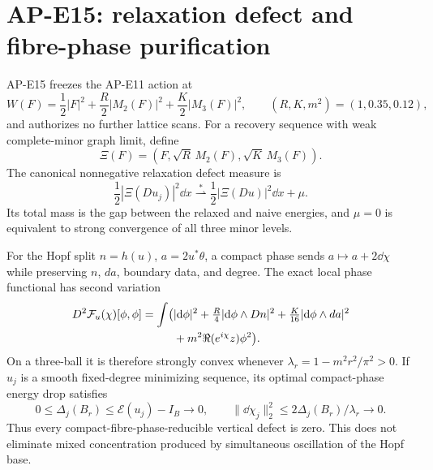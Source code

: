 \section{AP-E15: relaxation defect and fibre-phase purification}

AP-E15 freezes the AP-E11 action at
\begin{equation}
 W(F)=\frac12|F|^2+\frac R2|M_2(F)|^2+\frac K2|M_3(F)|^2,
 \qquad (R,K,m^2)=(1,0.35,0.12),
\end{equation}
and authorizes no further lattice scans.  For a recovery sequence with weak
complete-minor graph limit, define
\begin{equation}
 \Xi(F)=(F,\sqrt R\,M_2(F),\sqrt K\,M_3(F)).
\end{equation}
The canonical nonnegative relaxation defect measure is
\begin{equation}
 \frac12|\Xi(Du_j)|^2\dd x\stackrel{*}{\rightharpoonup}
 \frac12|\Xi(Du)|^2\dd x+\mu .
\end{equation}
Its total mass is the gap between the relaxed and naive energies, and
$\mu=0$ is equivalent to strong convergence of all three minor levels.

For the Hopf split $n=h(u)$, $a=2u^*\theta$, a compact phase sends
$a\mapsto a+2\dd\chi$ while preserving $n$, $da$, boundary data, and degree.
The exact local phase functional has second variation
\begin{align}
 D^2\mathcal F_u(\chi)[\phi,\phi]
 =\int\bigl(&|\mathrm d\phi|^2+\tfrac R4|\mathrm d\phi\wedge Dn|^2
 +\tfrac K{16}|\mathrm d\phi\wedge da|^2\notag\\
 &+m^2\Re(e^{i\chi}z)\phi^2\bigr).
\end{align}
On a three-ball it is therefore strongly convex whenever
$\lambda_r=1-m^2r^2/\pi^2>0$.  If $u_j$ is a smooth fixed-degree minimizing
sequence, its optimal compact-phase energy drop satisfies
\begin{equation}
 0\leq\Delta_j(B_r)\leq\mathcal E(u_j)-I_B\to0,\qquad
 \|\dd\chi_j\|_2^2\leq2\Delta_j(B_r)/\lambda_r\to0.
\end{equation}
Thus every compact-fibre-phase-reducible vertical defect is zero.  This does
not eliminate mixed concentration produced by simultaneous oscillation of
the Hopf base.

